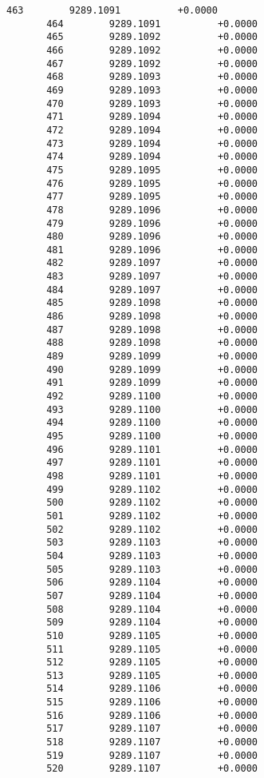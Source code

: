 \documentclass[11pt]{article}
\begin{document}
\begin{Verbatim}[commandchars=\\\{\}]
       463        9289.1091          +0.0000
       464        9289.1091          +0.0000
       465        9289.1092          +0.0000
       466        9289.1092          +0.0000
       467        9289.1092          +0.0000
       468        9289.1093          +0.0000
       469        9289.1093          +0.0000
       470        9289.1093          +0.0000
       471        9289.1094          +0.0000
       472        9289.1094          +0.0000
       473        9289.1094          +0.0000
       474        9289.1094          +0.0000
       475        9289.1095          +0.0000
       476        9289.1095          +0.0000
       477        9289.1095          +0.0000
       478        9289.1096          +0.0000
       479        9289.1096          +0.0000
       480        9289.1096          +0.0000
       481        9289.1096          +0.0000
       482        9289.1097          +0.0000
       483        9289.1097          +0.0000
       484        9289.1097          +0.0000
       485        9289.1098          +0.0000
       486        9289.1098          +0.0000
       487        9289.1098          +0.0000
       488        9289.1098          +0.0000
       489        9289.1099          +0.0000
       490        9289.1099          +0.0000
       491        9289.1099          +0.0000
       492        9289.1100          +0.0000
       493        9289.1100          +0.0000
       494        9289.1100          +0.0000
       495        9289.1100          +0.0000
       496        9289.1101          +0.0000
       497        9289.1101          +0.0000
       498        9289.1101          +0.0000
       499        9289.1102          +0.0000
       500        9289.1102          +0.0000
       501        9289.1102          +0.0000
       502        9289.1102          +0.0000
       503        9289.1103          +0.0000
       504        9289.1103          +0.0000
       505        9289.1103          +0.0000
       506        9289.1104          +0.0000
       507        9289.1104          +0.0000
       508        9289.1104          +0.0000
       509        9289.1104          +0.0000
       510        9289.1105          +0.0000
       511        9289.1105          +0.0000
       512        9289.1105          +0.0000
       513        9289.1105          +0.0000
       514        9289.1106          +0.0000
       515        9289.1106          +0.0000
       516        9289.1106          +0.0000
       517        9289.1107          +0.0000
       518        9289.1107          +0.0000
       519        9289.1107          +0.0000
       520        9289.1107          +0.0000

\end{Verbatim}
\end{document}
